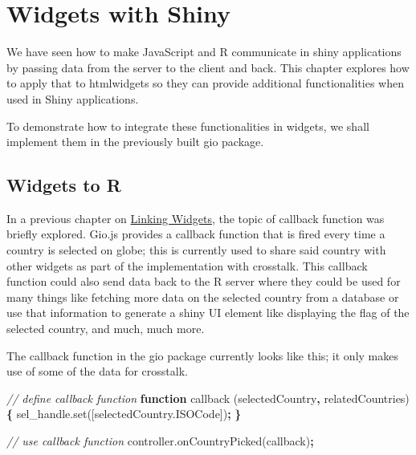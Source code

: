 \documentclass[
  10pt,
]{krantz}
\makeatletter
\newenvironment{Shaded}{\begin{snugshade}}{\end{snugshade}}
\newcommand{\AttributeTok}[1]{\textcolor[rgb]{0.61,0.61,0.61}{#1}}
\newcommand{\CommentTok}[1]{\textcolor[rgb]{0.37,0.37,0.37}{\textit{#1}}}
\newcommand{\KeywordTok}[1]{\textcolor[rgb]{0.27,0.27,0.27}{\textbf{#1}}}
\newcommand{\NormalTok}[1]{#1}
\newcommand{\OperatorTok}[1]{\textcolor[rgb]{0.43,0.43,0.43}{\textbf{#1}}}
\newcommand{\VariableTok}[1]{\textcolor[rgb]{0,0,0}{#1}}
\newenvironment{kframe}{%
\medskip{}
\setlength{\fboxsep}{.8em}
 \def\at@end@of@kframe{}%
 \ifinner\ifhmode%
  \def\at@end@of@kframe{\end{minipage}}%
  \begin{minipage}{\columnwidth}%
 \fi\fi%
 \def\FrameCommand##1{\hskip\@totalleftmargin \hskip-\fboxsep
 \colorbox{shadecolor}{##1}\hskip-\fboxsep
     \hskip-\linewidth \hskip-\@totalleftmargin \hskip\columnwidth}%
 \MakeFramed {\advance\hsize-\width
   \@totalleftmargin\z@ \linewidth\hsize
   \@setminipage}}%
 {\par\unskip\endMakeFramed%
 \at@end@of@kframe}
\renewenvironment{Shaded}{\begin{kframe}}{\end{kframe}}
\makeatother
\begin{document}
\hypertarget{shiny-widgets}{%
\chapter{Widgets with Shiny}\label{shiny-widgets}}

We have seen how to make JavaScript and R communicate in shiny applications by passing data from the server to the client and back. This chapter explores how to apply that to htmlwidgets so they can provide additional functionalities when used in Shiny applications.

To demonstrate how to integrate these functionalities in widgets, we shall implement them in the previously built gio package.

\hypertarget{shiny-widgets-to-r}{%
\section{Widgets to R}\label{shiny-widgets-to-r}}

In a previous chapter on \protect\hyperlink{linking-widgets}{Linking Widgets}, the topic of callback function was briefly explored. Gio.js provides a callback function that is fired every time a country is selected on globe; this is currently used to share said country with other widgets as part of the implementation with crosstalk. This callback function could also send data back to the R server where they could be used for many things like fetching more data on the selected country from a database or use that information to generate a shiny UI element like displaying the flag of the selected country, and much, much more.

The callback function in the gio package currently looks like this; it only makes use of some of the data for crosstalk.

\begin{Shaded}
\begin{Highlighting}[]
\CommentTok{// define callback function}
\KeywordTok{function} \AttributeTok{callback}\NormalTok{ (selectedCountry}\OperatorTok{,}\NormalTok{ relatedCountries) }\OperatorTok{\{}
  \VariableTok{sel\_handle}\NormalTok{.}\AttributeTok{set}\NormalTok{([}\VariableTok{selectedCountry}\NormalTok{.}\AttributeTok{ISOCode}\NormalTok{])}\OperatorTok{;}
\OperatorTok{\}}

\CommentTok{// use callback function}
\VariableTok{controller}\NormalTok{.}\AttributeTok{onCountryPicked}\NormalTok{(callback)}\OperatorTok{;}
\end{Highlighting}
\end{Shaded}
\end{document}
